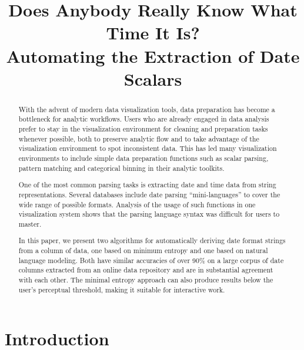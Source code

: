 \documentclass{acm_proc_article-sp}
\begin{document}

\title{Does Anybody Really Know What Time It Is?\\
Automating the Extraction of Date Scalars}


\maketitle
\begin{abstract}
With the advent of modern data visualization tools, data preparation has become a bottleneck for analytic workflows. Users who are already engaged in data analysis prefer to stay in the visualization environment for cleaning and preparation tasks whenever possible, both to preserve analytic flow and to take advantage of the visualization environment to spot inconsistent data. This has led many visualization environments to include simple data preparation functions such as scalar parsing, pattern matching and categorical binning in their analytic toolkits.

One of the most common parsing tasks is extracting date and time data from string representations. Several databases include date parsing ``mini-languages'' to cover the wide range of possible formats. Analysis of the usage of such functions in one visualization system shows that the parsing language syntax was difficult for users to master. 

In this paper, we present two algorithms for automatically deriving date format strings from a column of data, one based on minimum entropy and one based on natural language modeling. Both have similar accuracies of over 90\% on a large corpus of date columns extracted from an online data repository and are in substantial agreement with each other. The minimal entropy approach can also produce results below the user's perceptual threshold, making it suitable for interactive work.
\end{abstract}



\section{Introduction}

\end{document}
